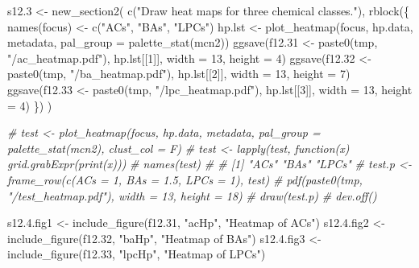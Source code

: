 \documentclass[
]{article}
\newenvironment{Shaded}{\begin{snugshade}}{\end{snugshade}}
\newcommand{\AttributeTok}[1]{\textcolor[rgb]{0.77,0.63,0.00}{#1}}
\newcommand{\CommentTok}[1]{\textcolor[rgb]{0.56,0.35,0.01}{\textit{#1}}}
\newcommand{\DecValTok}[1]{\textcolor[rgb]{0.00,0.00,0.81}{#1}}
\newcommand{\FloatTok}[1]{\textcolor[rgb]{0.00,0.00,0.81}{#1}}
\newcommand{\FunctionTok}[1]{\textcolor[rgb]{0.00,0.00,0.00}{#1}}
\newcommand{\NormalTok}[1]{#1}
\newcommand{\OtherTok}[1]{\textcolor[rgb]{0.56,0.35,0.01}{#1}}
\newcommand{\StringTok}[1]{\textcolor[rgb]{0.31,0.60,0.02}{#1}}
\begin{document}
\begin{Shaded}
\begin{Highlighting}[]
\NormalTok{s12}\FloatTok{.3} \OtherTok{\textless{}{-}} \FunctionTok{new\_section2}\NormalTok{(}
  \FunctionTok{c}\NormalTok{(}\StringTok{"Draw heat maps for three chemical classes."}\NormalTok{),}
  \FunctionTok{rblock}\NormalTok{(\{}
    \FunctionTok{names}\NormalTok{(focus) }\OtherTok{\textless{}{-}} \FunctionTok{c}\NormalTok{(}\StringTok{"ACs"}\NormalTok{, }\StringTok{"BAs"}\NormalTok{, }\StringTok{"LPCs"}\NormalTok{)}
\NormalTok{    hp.lst }\OtherTok{\textless{}{-}} \FunctionTok{plot\_heatmap}\NormalTok{(focus, hp.data, metadata, }\AttributeTok{pal\_group =} \FunctionTok{palette\_stat}\NormalTok{(mcn2))}
    \FunctionTok{ggsave}\NormalTok{(f12}\FloatTok{.31} \OtherTok{\textless{}{-}} \FunctionTok{paste0}\NormalTok{(tmp, }\StringTok{"/ac\_heatmap.pdf"}\NormalTok{), hp.lst[[}\DecValTok{1}\NormalTok{]], }\AttributeTok{width =} \DecValTok{13}\NormalTok{, }\AttributeTok{height =} \DecValTok{4}\NormalTok{)}
    \FunctionTok{ggsave}\NormalTok{(f12}\FloatTok{.32} \OtherTok{\textless{}{-}} \FunctionTok{paste0}\NormalTok{(tmp, }\StringTok{"/ba\_heatmap.pdf"}\NormalTok{), hp.lst[[}\DecValTok{2}\NormalTok{]], }\AttributeTok{width =} \DecValTok{13}\NormalTok{, }\AttributeTok{height =} \DecValTok{7}\NormalTok{)}
    \FunctionTok{ggsave}\NormalTok{(f12}\FloatTok{.33} \OtherTok{\textless{}{-}} \FunctionTok{paste0}\NormalTok{(tmp, }\StringTok{"/lpc\_heatmap.pdf"}\NormalTok{), hp.lst[[}\DecValTok{3}\NormalTok{]], }\AttributeTok{width =} \DecValTok{13}\NormalTok{, }\AttributeTok{height =} \DecValTok{4}\NormalTok{)}
\NormalTok{  \})}
\NormalTok{)}

\CommentTok{\# test \textless{}{-} plot\_heatmap(focus, hp.data, metadata, pal\_group = palette\_stat(mcn2), clust\_col = F)}
\CommentTok{\# test \textless{}{-} lapply(test, function(x) grid.grabExpr(print(x)))}
\CommentTok{\# names(test)}
\CommentTok{\# \# [1] "ACs"  "BAs"  "LPCs"}
\CommentTok{\# test.p \textless{}{-} frame\_row(c(ACs = 1, BAs = 1.5, LPCs = 1), test)}
\CommentTok{\# pdf(paste0(tmp, "/test\_heatmap.pdf"), width = 13, height = 18)}
\CommentTok{\# draw(test.p)}
\CommentTok{\# dev.off()}

\NormalTok{s12.}\FloatTok{4.}\NormalTok{fig1 }\OtherTok{\textless{}{-}} \FunctionTok{include\_figure}\NormalTok{(f12}\FloatTok{.31}\NormalTok{, }\StringTok{"acHp"}\NormalTok{, }\StringTok{"Heatmap of ACs"}\NormalTok{)}
\NormalTok{s12.}\FloatTok{4.}\NormalTok{fig2 }\OtherTok{\textless{}{-}} \FunctionTok{include\_figure}\NormalTok{(f12}\FloatTok{.32}\NormalTok{, }\StringTok{"baHp"}\NormalTok{, }\StringTok{"Heatmap of BAs"}\NormalTok{)}
\NormalTok{s12.}\FloatTok{4.}\NormalTok{fig3 }\OtherTok{\textless{}{-}} \FunctionTok{include\_figure}\NormalTok{(f12}\FloatTok{.33}\NormalTok{, }\StringTok{"lpcHp"}\NormalTok{, }\StringTok{"Heatmap of LPCs"}\NormalTok{)}


\end{Highlighting}
\end{Shaded}
\end{document}
